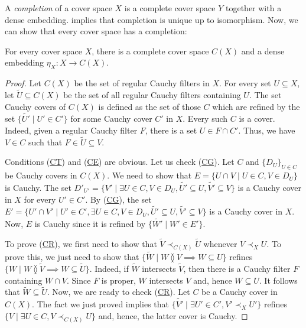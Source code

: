 \documentclass[reqno]{amsart}
\newcommand{\axref}[1]{(\hyperref[ax:#1]{#1})}
\theoremstyle{definition}
\theoremstyle{remark}
\numberwithin{figure}{section}
\newcommand{\overlap}[2]{#1 \between #2}
\newcommand{\rb}{\prec}
\begin{document}
A \emph{completion} of a cover space $X$ is a complete cover space $Y$ together with a dense embedding.
 implies that completion is unique up to isomorphism.
Now, we can show that every cover space has a completion:

\begin{thm}[completion]
For every cover space $X$, there is a complete cover space $C(X)$ and a dense embedding $\eta_X : X \to C(X)$.
\end{thm}
\begin{proof}
Let $C(X)$ be the set of regular Cauchy filters in $X$.
For every set $U \subseteq X$, let $\widetilde{U} \subseteq C(X)$ be the set of all regular Cauchy filters containing $U$.
The set Cauchy covers of $C(X)$ is defined as the set of those $C$ which are refined by the set $\{ \widetilde{U'} \mid U' \in C' \}$ for some Cauchy cover $C'$ in $X$.
Every such $C$ is a cover.
Indeed, given a regular Cauchy filter $F$, there is a set $U \in F \cap C'$.
Thus, we have $V \in C$ such that $F \in \widetilde{U} \subseteq V$.

Conditions \axref{CT} and \axref{CE} are obvious.
Let us check \axref{CG}.
Let $C$ and $\{ D_U \}_{U \in C}$ be Cauchy covers in $C(X)$.
We need to show that $E = \{ U \cap V \mid U \in C, V \in D_U \}$ is Cauchy.
The set $D'_{U'} = \{ V' \mid \exists U \in C, V \in D_U, \widetilde{U'} \subseteq U, \widetilde{V'} \subseteq V \}$ is a Cauchy cover in $X$ for every $U' \in C'$.
By \axref{CG}, the set $E' = \{ U' \cap V' \mid U' \in C', \exists U \in C, V \in D_U, \widetilde{U'} \subseteq U, \widetilde{V'} \subseteq V \}$ is a Cauchy cover in $X$.
Now, $E$ is Cauchy since it is refined by $\{ \widetilde{W'} \mid W' \in E' \}$.

To prove \axref{CR}, we first need to show that $\widetilde{V} \rb_{C(X)} \widetilde{U}$ whenever $V \rb_X U$.
To prove this, we just need to show that $\{ \widetilde{W} \mid \overlap{W}{V} \implies W \subseteq U \}$ refines $\{ W \mid \overlap{W}{\widetilde{V}} \implies W \subseteq \widetilde{U} \}$.
Indeed, if $\widetilde{W}$ intersects $\widetilde{V}$, then there is a Cauchy filter $F$ containing $W \cap V$.
Since $F$ is proper, $W$ intersects $V$ and, hence $W \subseteq U$.
It follows that $\widetilde{W} \subseteq \widetilde{U}$.
Now, we are ready to check \axref{CR}.
Let $C$ be a Cauchy cover in $C(X)$.
The fact we just proved implies that $\{ \widetilde{V'} \mid \exists U' \in C', V' \rb_X U' \}$ refines $\{ V \mid \exists U \in C, V \rb_{C(X)} U \}$ and, hence, the latter cover is Cauchy.


\end{proof}
\end{document}
